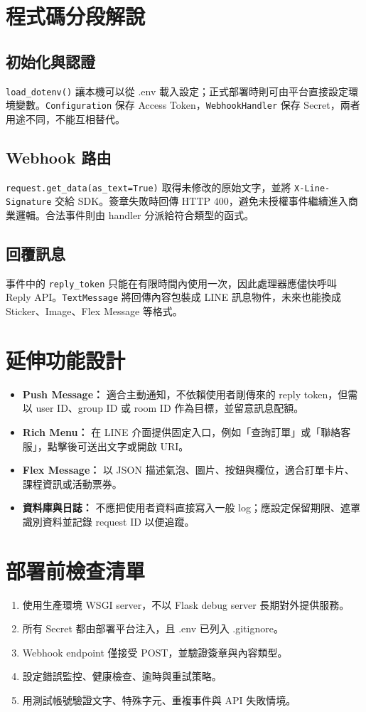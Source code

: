 \documentclass[12pt,a4paper]{report}
\begin{document}
\section{程式碼分段解說}
\subsection{初始化與認證}
\texttt{load\_dotenv()} 讓本機可以從 .env 載入設定；正式部署時則可由平台直接設定環境變數。\texttt{Configuration} 保存 Access Token，\texttt{WebhookHandler} 保存 Secret，兩者用途不同，不能互相替代。

\subsection{Webhook 路由}
\texttt{request.get\_data(as\_text=True)} 取得未修改的原始文字，並將 \texttt{X-Line-Signature} 交給 SDK。簽章失敗時回傳 HTTP 400，避免未授權事件繼續進入商業邏輯。合法事件則由 handler 分派給符合類型的函式。

\subsection{回覆訊息}
事件中的 \texttt{reply\_token} 只能在有限時間內使用一次，因此處理器應儘快呼叫 Reply API。\texttt{TextMessage} 將回傳內容包裝成 LINE 訊息物件，未來也能換成 Sticker、Image、Flex Message 等格式。

\section{延伸功能設計}
\begin{itemize}
  \item \textbf{Push Message：} 適合主動通知，不依賴使用者剛傳來的 reply token，但需以 user ID、group ID 或 room ID 作為目標，並留意訊息配額。
  \item \textbf{Rich Menu：} 在 LINE 介面提供固定入口，例如「查詢訂單」或「聯絡客服」，點擊後可送出文字或開啟 URI。
  \item \textbf{Flex Message：} 以 JSON 描述氣泡、圖片、按鈕與欄位，適合訂單卡片、課程資訊或活動票券。
  \item \textbf{資料庫與日誌：} 不應把使用者資料直接寫入一般 log；應設定保留期限、遮罩識別資料並記錄 request ID 以便追蹤。
\end{itemize}

\section{部署前檢查清單}
\begin{enumerate}
  \item 使用生產環境 WSGI server，不以 Flask debug server 長期對外提供服務。
  \item 所有 Secret 都由部署平台注入，且 .env 已列入 .gitignore。
  \item Webhook endpoint 僅接受 POST，並驗證簽章與內容類型。
  \item 設定錯誤監控、健康檢查、逾時與重試策略。
  \item 用測試帳號驗證文字、特殊字元、重複事件與 API 失敗情境。
\end{enumerate}
\end{document}
